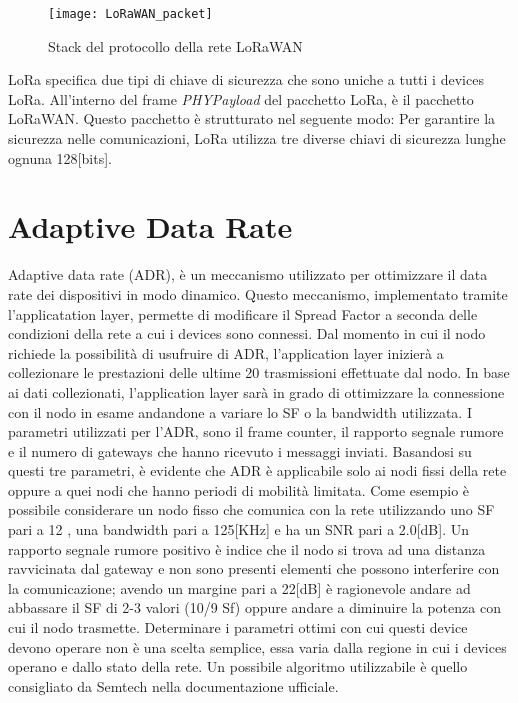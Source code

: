 \begin{figure}[h]
        \centering 
                \texttt{[image: LoRaWAN\_packet]}
        \caption{Stack del protocollo della rete LoRaWAN}
        \label{fig:stack_lora}
\end{figure}

LoRa specifica due tipi di chiave di sicurezza che sono uniche a tutti i devices
LoRa.
All'interno del frame \emph{PHYPayload} del pacchetto LoRa,  è il pacchetto
LoRaWAN. Questo pacchetto è strutturato nel seguente modo:
Per garantire la sicurezza nelle comunicazioni, LoRa utilizza tre diverse chiavi
di sicurezza lunghe ognuna 128[bits].

\section{Adaptive Data Rate}
Adaptive data rate (ADR), è un meccanismo utilizzato per ottimizzare il data
rate dei dispositivi in modo dinamico. Questo meccanismo, implementato tramite
l'applicatation layer, permette di modificare il Spread Factor a seconda delle
condizioni della rete a cui i devices sono connessi. Dal momento in cui il nodo
richiede la possibilità di usufruire di ADR, l'application layer inizierà a
collezionare le prestazioni delle ultime 20 trasmissioni effettuate dal nodo.
In base ai dati collezionati, l'application layer sarà in grado di ottimizzare
la connessione con il nodo in esame andandone a variare lo SF o la bandwidth
utilizzata.  I parametri utilizzati per l'ADR, sono il frame counter, il
rapporto segnale rumore e il numero di gateways che hanno ricevuto i messaggi
inviati.  Basandosi su questi tre parametri, è evidente che ADR è applicabile
solo ai nodi fissi della rete oppure a quei nodi che hanno periodi di mobilità
limitata.  Come esempio è possibile considerare un nodo fisso che comunica con
la rete utilizzando uno SF pari a 12 , una bandwidth pari a 125[KHz] e ha un SNR
pari a 2.0[dB]. Un rapporto segnale rumore positivo è indice che il nodo si
trova ad una distanza ravvicinata dal gateway e non sono presenti elementi che
possono interferire con la comunicazione; avendo un margine pari a 22[dB] è
ragionevole andare ad abbassare il SF di 2-3 valori (10/9 Sf) oppure andare a
diminuire la potenza con cui il nodo trasmette. Determinare i parametri ottimi
con cui questi device devono operare non è una scelta semplice, essa varia dalla
regione in cui i devices operano e dallo stato della rete. Un possibile
algoritmo utilizzabile è quello consigliato da Semtech nella documentazione
ufficiale.


